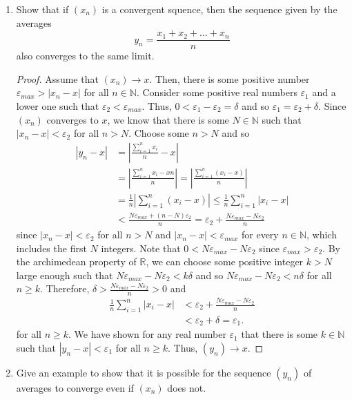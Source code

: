 \documentclass[12pt]{article}
\newcommand{\N}{\mathbb{N}}
\newcommand{\R}{\mathbb{R}}
\newcommand{\Abs}[1]{\left\vert #1 \right\vert}
\newenvironment{problem}[2][Problem]{\begin{trivlist} \item[\hskip \labelsep {\bfseries #1}\hskip \labelsep {\bfseries #2.}]}{\end{trivlist}}
\begin{document}
    \begin{problem}{2.3.11 (Cesaro Means)}
    \begin{enumerate}
      \item Show that if $(x_{n})$ is a convergent squence, then the sequence given by the averages
    \begin{equation*}
      y_{n} = \frac{x_{1}+x_{2}+\dots+x_{n}}{n}
    \end{equation*}
    also converges to the same limit.
    \begin{proof}
      Assume that $(x_{n}) \to x$. Then, there is some positive number $\varepsilon_{max} > \Abs{x_{n}-x}$ for all $n\in \N$. Consider some positive real numbers $\varepsilon_{1}$ and a lower one such that $\varepsilon_{2} < \varepsilon_{max}$. Thus, $0 < \varepsilon_{1} - \varepsilon_{2} = \delta$ and so $\varepsilon_{1} = \varepsilon_{2}+\delta$. Since $(x_{n})$ converges to $x$, we know that there is some $N \in \N$ such that $|x_{n} -x| < \varepsilon_{2}$ for all $n> N$. Choose some $n>N$ and so 
    \begin{align*}
      \Abs{y_{n} - x} &= \Abs{\frac{\sum_{i=1}^{n} x_{i}}{n} - x}\\
      &= \Abs{\frac{\sum_{i=1}^{n} x_{i} - xn}{n}} = \Abs{\frac{\sum_{i=1}^{n} (x_{i} - x)}{n}}\\
      &= \frac{1}{n} \Abs{\sum_{i=1}^{n} (x_{i}-x)} \leq \frac{1}{n} \sum_{i=1}^{n} \Abs{x_{i}-x}\\
      &< \frac{N\varepsilon_{max} + (n-N)\varepsilon_{2}}{n} = \varepsilon_{2} + \frac{N\varepsilon_{max} - N\varepsilon_{2}}{n}
    \end{align*}
    since $|x_{n} - x|< \varepsilon_{2}$ for all $n>N$ and $|x_{n} - x| < \varepsilon_{max}$ for every $n\in \N$, which includes the first $N$ integers. Note that $0< N\varepsilon_{max} - N\varepsilon_{2}$ since $\varepsilon_{max} > \varepsilon_{2}$. By the archimedean property of $\R$, we can choose some positive integer $k>N$ large enough such that $N\varepsilon_{max} - N\varepsilon_{2} < k\delta$ and so $N\varepsilon_{max} - N\varepsilon_{2} < n\delta$ for all $n\geq k$. Therefore, $\delta > \frac{N\varepsilon_{max} - N\varepsilon_{2}}{n}>0$ and 
    \begin{align*}
       \frac{1}{n} \sum_{i=1}^{n} \Abs{x_{i}-x} &< \varepsilon_{2} + \frac{N\varepsilon_{max} - N\varepsilon_{2}}{n}\\ 
       &< \varepsilon_{2} + \delta = \varepsilon_{1}.
    \end{align*}
    for all $n\geq k$. We have shown for any real number $\varepsilon_{1}$ that there is some $k\in \N$ such that $|y_{n} - x| < \varepsilon_{1}$ for all $n\geq k$. Thus, $(y_{n}) \to x$.
    \end{proof}
  \item Give an example to show that it is possible for the sequence $(y_{n})$ of averages to converge even if $(x_{n})$ does not.
    \end{enumerate}
    \end{problem}
\end{document}
